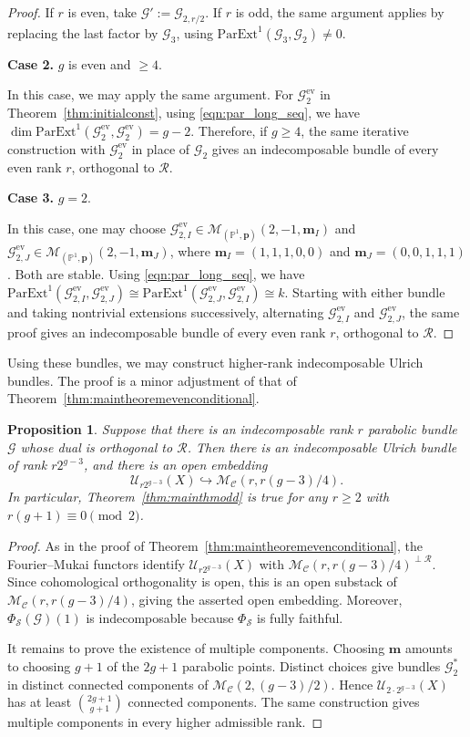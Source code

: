 \documentclass[12pt, letterpaper]{amsart}
\newtheorem{proposition}[theorem]{Proposition}
\theoremstyle{definition}
\newcommand{\PP}{\mathbb{P} }
\newcommand{\cC}{\mathcal{C} }
\newcommand{\cG}{\mathcal{G} }
\newcommand{\cM}{\mathcal{M} }
\newcommand{\cR}{\mathcal{R} }
\newcommand{\cS}{\mathcal{S} }
\newcommand{\cU}{\mathcal{U} }
\newcommand{\bp}{\mathbf{p} }
\newcommand{\bm}{\mathbf{m} }
\def\pExt{\mathrm{ParExt} }
\begin{document}
\begin{proof}
If \(r\) is even, take \(\cG':=\cG_{2,r/2}\). If \(r\) is odd, the same argument applies by replacing the last factor by \(\cG_3\), using \(\pExt^1(\cG_3,\cG_2)\ne0\).

\textbf{Case 2.} \(g\) is even and \(\ge 4\).

In this case, we may apply the same argument. For \(\cG_2^{\mathrm{ev}}\) in Theorem~\ref{thm:initialconst}, using \eqref{eqn:par_long_seq}, we have \(\dim \pExt^1(\cG_2^{\mathrm{ev}}, \cG_2^{\mathrm{ev}}) = g-2\). Therefore, if \(g \ge 4\), the same iterative construction with \(\cG_2^{\mathrm{ev}}\) in place of \(\cG_2\) gives an indecomposable bundle of every even rank \(r\), orthogonal to \(\cR\).

\textbf{Case 3.} \(g = 2\).

In this case, one may choose \(\cG_{2, I}^{\mathrm{ev}} \in \cM_{(\PP^1, \bp)}(2, -1, \bm_I)\) and \(\cG_{2, J}^{\mathrm{ev}} \in \cM_{(\PP^1, \bp)}(2, -1, \bm_J)\), where \(\bm_I = (1, 1, 1, 0, 0)\) and \(\bm_J = (0, 0, 1, 1, 1)\). Both are stable. Using \eqref{eqn:par_long_seq}, we have \(\pExt^1(\cG_{2, I}^{\mathrm{ev}}, \cG_{2, J}^{\mathrm{ev}})\cong\pExt^1(\cG_{2, J}^{\mathrm{ev}}, \cG_{2, I}^{\mathrm{ev}})\cong k\). Starting with either bundle and taking nontrivial extensions successively, alternating \(\cG_{2,I}^{\mathrm{ev}}\) and \(\cG_{2,J}^{\mathrm{ev}}\), the same proof gives an indecomposable bundle of every even rank \(r\), orthogonal to \(\cR\).
\end{proof}

Using these bundles, we may construct higher-rank indecomposable Ulrich bundles. The proof is a minor adjustment of that of Theorem~\ref{thm:maintheoremevenconditional}.

\begin{proposition}\label{prop:maintheoremoddconditional}
Suppose that there is an indecomposable rank \(r\) parabolic bundle \(\cG\) whose dual is orthogonal to \(\cR\). Then there is an indecomposable Ulrich bundle of rank \(r2^{g-3}\), and there is an open embedding
\[\cU_{r2^{g-3}}(X)\hookrightarrow\cM_{\cC}(r,r(g-3)/4).\]
In particular, Theorem~\ref{thm:mainthmodd} is true for any \(r\ge2\) with \(r(g+1)\equiv0\pmod2\).
\end{proposition}

\begin{proof}
As in the proof of Theorem~\ref{thm:maintheoremevenconditional}, the Fourier--Mukai functors identify \(\cU_{r2^{g-3}}(X)\) with \(\cM_{\cC}(r,r(g-3)/4)^{\perp\cR}\). Since cohomological orthogonality is open, this is an open substack of \(\cM_{\cC}(r,r(g-3)/4)\), giving the asserted open embedding. Moreover, \(\Phi_{\cS}(\cG)(1)\) is indecomposable because \(\Phi_{\cS}\) is fully faithful.

It remains to prove the existence of multiple components. Choosing \(\bm\) amounts to choosing \(g+1\) of the \(2g+1\) parabolic points. Distinct choices give bundles \(\cG_2^*\) in distinct connected components of \(\cM_{\cC}(2,(g-3)/2)\). Hence \(\cU_{2\cdot2^{g-3}}(X)\) has at least \(\binom{2g+1}{g+1}\) connected components. The same construction gives multiple components in every higher admissible rank.
\end{proof}
\end{document}
